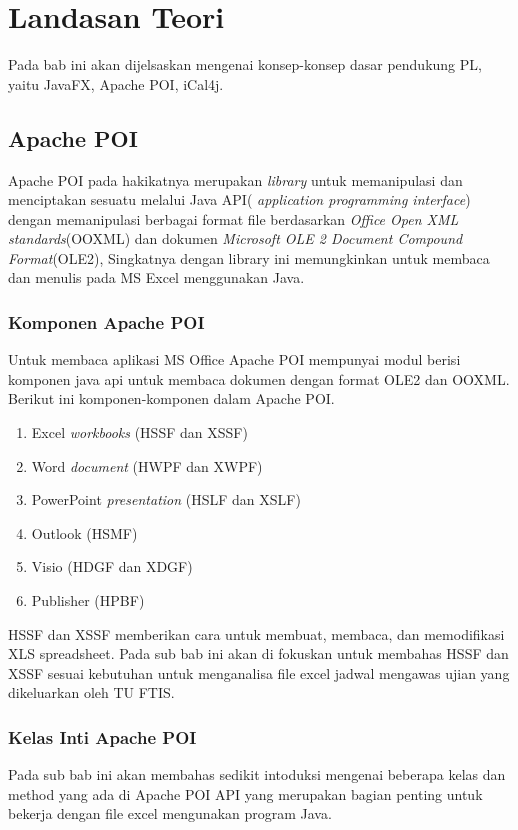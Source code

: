 \chapter{Landasan Teori}
\label{chap:teori}
Pada bab ini akan dijelsaskan mengenai konsep-konsep dasar pendukung PL, yaitu JavaFX, Apache POI, iCal4j.

\section{Apache POI}
\label{sec:apache} 

Apache POI pada hakikatnya merupakan \textit{library} untuk memanipulasi dan menciptakan sesuatu melalui Java API( \textit{application programming interface}) dengan memanipulasi berbagai format file berdasarkan \textit{Office Open XML standards}(OOXML) dan dokumen \textit{Microsoft OLE 2 Document Compound Format}(OLE2), Singkatnya dengan library ini memungkinkan untuk membaca dan menulis pada MS Excel menggunakan Java.\cite{apachepoi} \\


\subsection{Komponen Apache POI}
\label{subs:komponen} 
Untuk membaca aplikasi MS Office Apache POI mempunyai modul berisi komponen java api untuk membaca dokumen dengan format OLE2 dan OOXML. Berikut ini komponen-komponen dalam Apache POI.\cite{apachepoi}  

\begin{enumerate}
	\item Excel \textit{workbooks} (HSSF dan XSSF)
	\item Word \textit{document} (HWPF dan XWPF)
	\item PowerPoint \textit{presentation} (HSLF dan XSLF)
	\item Outlook (HSMF)
	\item Visio (HDGF dan XDGF)
	\item Publisher (HPBF)
\end{enumerate}

HSSF dan XSSF memberikan cara untuk membuat, membaca, dan memodifikasi XLS spreadsheet. Pada sub bab ini akan di fokuskan untuk membahas HSSF dan XSSF sesuai kebutuhan untuk menganalisa file excel jadwal mengawas ujian yang dikeluarkan oleh TU FTIS.\cite{apachepoi}


\subsection{Kelas Inti Apache POI}
\label{subs:kelas_inti}  
Pada sub bab ini akan membahas sedikit intoduksi mengenai beberapa kelas dan method yang ada di Apache POI API yang merupakan bagian penting untuk bekerja dengan file excel mengunakan program Java.\cite{apachepoi2}

